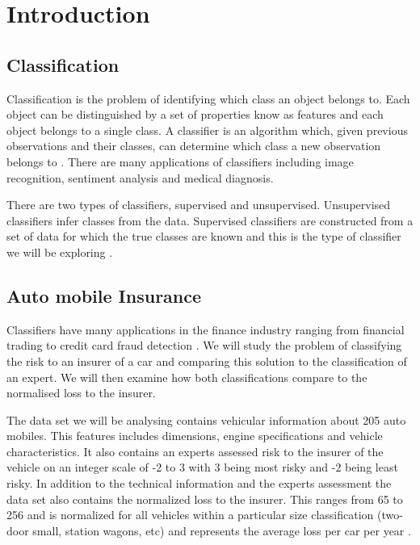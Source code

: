 \chapter{Introduction}

\section{Classification}

Classification is the problem of identifying which class an object belongs to. Each object can be distinguished by a set of properties know as features and each object belongs to a single class. A classifier is an algorithm which, given previous observations and their classes, can determine which class a new observation belongs to \cite{Theodoridis03}. There are many applications of classifiers including image recognition, sentiment analysis and medical diagnosis.

There are two types of classifiers, supervised and unsupervised. Unsupervised classifiers infer classes from the data. Supervised classifiers are constructed from a set of data for which the true classes are known and this is the type of classifier we will be exploring \cite{Michie94}.

\section{Auto mobile Insurance}

Classifiers have many applications in the finance industry ranging from financial trading \cite{Gerlein16} to credit card fraud detection \cite{Pozzolo15}. We will study the problem of classifying the risk to an insurer of a car and comparing this solution to the classification of an expert. We will then examine how both classifications compare to the normalised loss to the insurer.

The data set we will be analysing contains vehicular information about 205 auto mobiles. This features includes dimensions, engine specifications and vehicle characteristics. It also contains an experts assessed risk to the insurer of the vehicle on an integer scale of -2 to 3 with 3 being most risky and -2 being least risky. In addition to the technical information and the experts assessment the data set also contains the normalized loss to the insurer. This ranges from 65 to 256 and is normalized for all vehicles within a particular size classification (two-door small, station wagons, etc) and represents the average loss per car per year \cite{Automobile}.